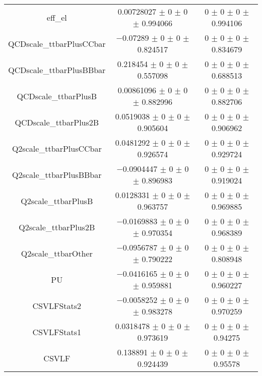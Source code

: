 \begin{table}
\begin{tabular}{ccc}
eff\_el 	& \num{0.00728027} $\pm$ \num{0} $\pm$ \num{0} $\pm$ \num{0.994066} 	& \num{0} $\pm$ \num{0} $\pm$ \num{0} $\pm$ \num{0.994106}\\
QCDscale\_ttbarPlusCCbar 	& \num{-0.07289} $\pm$ \num{0} $\pm$ \num{0} $\pm$ \num{0.824517} 	& \num{0} $\pm$ \num{0} $\pm$ \num{0} $\pm$ \num{0.834679}\\
QCDscale\_ttbarPlusBBbar 	& \num{0.218454} $\pm$ \num{0} $\pm$ \num{0} $\pm$ \num{0.557098} 	& \num{0} $\pm$ \num{0} $\pm$ \num{0} $\pm$ \num{0.688513}\\
QCDscale\_ttbarPlusB 	& \num{0.00861096} $\pm$ \num{0} $\pm$ \num{0} $\pm$ \num{0.882996} 	& \num{0} $\pm$ \num{0} $\pm$ \num{0} $\pm$ \num{0.882706}\\
QCDscale\_ttbarPlus2B 	& \num{0.0519038} $\pm$ \num{0} $\pm$ \num{0} $\pm$ \num{0.905604} 	& \num{0} $\pm$ \num{0} $\pm$ \num{0} $\pm$ \num{0.906962}\\
Q2scale\_ttbarPlusCCbar 	& \num{0.0481292} $\pm$ \num{0} $\pm$ \num{0} $\pm$ \num{0.926574} 	& \num{0} $\pm$ \num{0} $\pm$ \num{0} $\pm$ \num{0.929724}\\
Q2scale\_ttbarPlusBBbar 	& \num{-0.0904447} $\pm$ \num{0} $\pm$ \num{0} $\pm$ \num{0.896983} 	& \num{0} $\pm$ \num{0} $\pm$ \num{0} $\pm$ \num{0.919024}\\
Q2scale\_ttbarPlusB 	& \num{0.0128331} $\pm$ \num{0} $\pm$ \num{0} $\pm$ \num{0.963757} 	& \num{0} $\pm$ \num{0} $\pm$ \num{0} $\pm$ \num{0.969885}\\
Q2scale\_ttbarPlus2B 	& \num{-0.0169883} $\pm$ \num{0} $\pm$ \num{0} $\pm$ \num{0.970354} 	& \num{0} $\pm$ \num{0} $\pm$ \num{0} $\pm$ \num{0.968389}\\
Q2scale\_ttbarOther 	& \num{-0.0956787} $\pm$ \num{0} $\pm$ \num{0} $\pm$ \num{0.790222} 	& \num{0} $\pm$ \num{0} $\pm$ \num{0} $\pm$ \num{0.808948}\\
PU 	& \num{-0.0416165} $\pm$ \num{0} $\pm$ \num{0} $\pm$ \num{0.959881} 	& \num{0} $\pm$ \num{0} $\pm$ \num{0} $\pm$ \num{0.960227}\\
CSVLFStats2 	& \num{-0.0058252} $\pm$ \num{0} $\pm$ \num{0} $\pm$ \num{0.983278} 	& \num{0} $\pm$ \num{0} $\pm$ \num{0} $\pm$ \num{0.970259}\\
CSVLFStats1 	& \num{0.0318478} $\pm$ \num{0} $\pm$ \num{0} $\pm$ \num{0.973619} 	& \num{0} $\pm$ \num{0} $\pm$ \num{0} $\pm$ \num{0.94275}\\
CSVLF 	& \num{0.138891} $\pm$ \num{0} $\pm$ \num{0} $\pm$ \num{0.924439} 	& \num{0} $\pm$ \num{0} $\pm$ \num{0} $\pm$ \num{0.95578}\\

\end{tabular}
\end{table}
